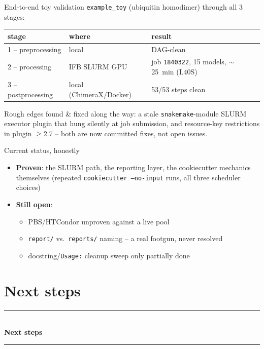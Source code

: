 \documentclass[aspectratio=169]{beamer}
\newcommand{\currentsubsectionname}{}
\newcommand{\sectiondivider}[1]{%
  {\setbeamertemplate{frametitle}{}%
  \begin{frame}
    \vfill
    \begin{center}
      {\color{accent}\rule{0.35\textwidth}{0.6pt}}\\[1.1em]
      {\color{fgtext}\Huge\bfseries #1}\\[1.1em]
      {\color{accent}\rule{0.35\textwidth}{0.6pt}}
    \end{center}
    \vfill
  \end{frame}}%
}
\begin{document}
\begin{frame}{End-to-end toy validation}
  \footnotesize
  \texttt{example\_toy} (ubiquitin homodimer) through all 3 stages:

  \vspace{0.4em}
  \begin{center}
  \begin{tabular}{@{}lll@{}}
    \toprule
    stage & where & result \\
    \midrule
    1 -- preprocessing & local & DAG-clean \\
    2 -- processing & IFB SLURM GPU & job \texttt{1840322}, 15 models, $\sim$25~min (L40S) \\
    3 -- postprocessing & local (ChimeraX/Docker) & 53/53 steps clean \\
    \bottomrule
  \end{tabular}
  \end{center}

  \vspace{0.6em}
  Rough edges found \& fixed along the way: a stale \texttt{snakemake}-module
  SLURM executor plugin that hung silently at job submission, and
  resource-key restrictions in plugin $\geq$2.7 -- both are now committed
  fixes, not open issues.
\end{frame}

\begin{frame}{Current status, honestly}
  \begin{itemize}
    \item \textbf{Proven}: the SLURM path, the reporting layer, the
      cookiecutter mechanics themselves (repeated
      \texttt{cookiecutter --no-input} runs, all three scheduler choices)
    \item \textbf{Still open}:
      \begin{itemize}
        \item PBS/HTCondor unproven against a live pool
        \item \texttt{report/} vs.\ \texttt{reports/} naming -- a real
          footgun, never resolved
        \item docstring/\texttt{Usage:} cleanup sweep only partially done
      \end{itemize}
  \end{itemize}
\end{frame}

\section{Next steps}
\gdef\currentsubsectionname{}
\sectiondivider{Next steps}
\end{document}
